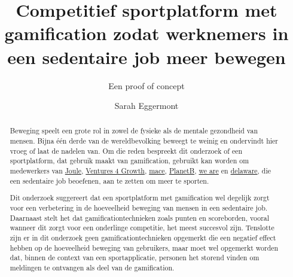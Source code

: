 \documentclass[a0,portrait]{hogent-poster}
\title{Competitief sportplatform met gamification zodat werknemers in een sedentaire job meer bewegen}
\subtitle{Een proof of concept}
\author{Sarah Eggermont}
\begin{document}
\maketitle

\begin{abstract}

Beweging speelt een grote rol in zowel de fysieke als de mentale gezondheid van mensen. Bijna één derde van de wereldbevolking beweegt te weinig en ondervindt hier vroeg of laat de nadelen van. Om die reden bespreekt dit onderzoek of een sportplatform, dat gebruik maakt van gamification, gebruikt kan worden om medewerkers van \href{https://en.joule.be/}{Joule}, \href{https://www.ventures4growth.com/en}{Ventures 4 Growth}, \href{https://www.mace-legal.com/}{mace}, \href{https://planetb.life/en}{PlanetB}, \href{https://www.we-are.be/}{we are} en \href{https://www.delaware.pro/en-be}{delaware}, die een sedentaire job beoefenen, aan te zetten om meer te sporten.

Dit onderzoek suggereert dat een sportplatform met gamification wel degelijk zorgt voor een verbetering in de hoeveelheid beweging van mensen in een sedentaire job. Daarnaast stelt het dat gamificationtechnieken zoals punten en scoreborden, vooral wanneer dit zorgt voor een onderlinge competitie, het meest succesvol zijn. Tenslotte zijn er in dit onderzoek geen gamificationtechnieken opgemerkt die een negatief effect hebben op de hoeveelheid beweging van gebruikers, maar moet wel opgemerkt worden dat, binnen de context van een sportapplicatie, personen het storend vinden om meldingen te ontvangen als deel van de gamification.

\end{abstract}
\end{document}
